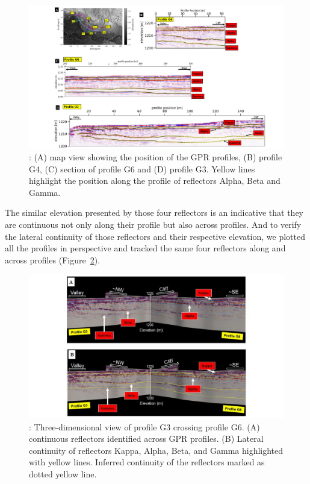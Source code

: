 \documentclass[5p]{elsarticle}
\begin{document}
								 \begin{figure}[h]

	\includegraphics[width=\textwidth]{Figures/Profiles_G3_G4_G6.pdf}
		\caption{: (A) map view showing the position of the GPR profiles, (B) profile G4, (C) section of profile G6 and (D) profile G3. Yellow lines highlight the position along the profile of reflectors Alpha, Beta and Gamma. \label{Profiles_G3_G4_G6}}

								   \end{figure}
								   
The similar elevation presented by those four reflectors is an indicative that they are continuous not only along their profile but also across profiles. And to verify the lateral continuity of those reflectors and their respective elevation, we plotted all the profiles in perspective and tracked the same four reflectors along and across profiles (Figure~\ref{Profiles_G3_G6}).						   
								   
								   \begin{figure}[h]

	\includegraphics[width=\textwidth]{Figures/Profiles_G3_G6.pdf}
		\caption{: Three-dimensional view of profile G3 crossing profile G6. (A) continuous reflectors identified across GPR profiles. (B) Lateral continuity of reflectors Kappa, Alpha, Beta, and Gamma highlighted with yellow lines. Inferred continuity of the reflectors marked as dotted yellow line.  \label{Profiles_G3_G6}}

								   \end{figure}
	
\end{document}

